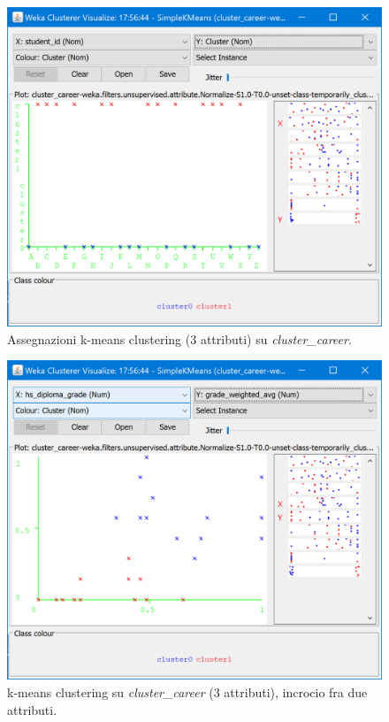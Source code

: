 \documentclass[]{article}
\begin{document}
\begin{figure}[!]
	\centering
	\includegraphics[scale=0.6]{Img/kmeans_career_3attributi_assegnamenti.png}
	\caption{Assegnazioni k-means clustering (3 attributi) su \textit{cluster\_career}.
		\label{fig:5}}
\end{figure} 

\begin{figure}[!]
	\centering
	\includegraphics[scale=0.6]{Img/kmeans_career_3Attributi_incrocio.png}
	\caption{k-means clustering su \textit{cluster\_career} (3 attributi), incrocio fra due attributi.
		\label{fig:6}}
\end{figure} 
\end{document}
